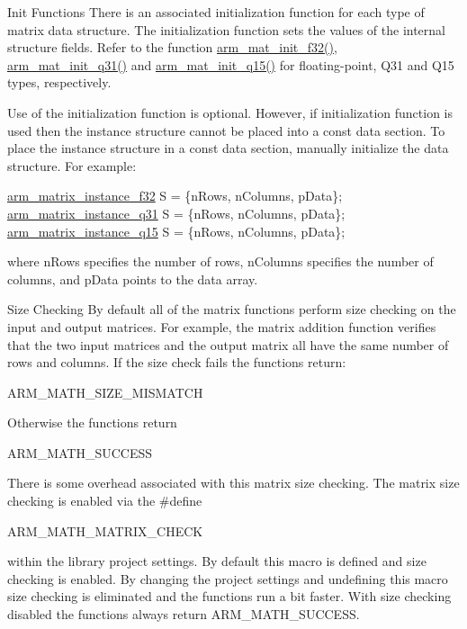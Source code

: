 \begin{DoxyParagraph}{Init Functions}
There is an associated initialization function for each type of matrix data structure. The initialization function sets the values of the internal structure fields. Refer to the function {\ttfamily \mbox{\hyperlink{arm__math_8h_a11e3dc41592a6401c13182fef9416a27}{arm\+\_\+mat\+\_\+init\+\_\+f32()}}}, {\ttfamily \mbox{\hyperlink{arm__math_8h_a48a5e5d37e1f062cc57fcfaf683343cc}{arm\+\_\+mat\+\_\+init\+\_\+q31()}}} and {\ttfamily \mbox{\hyperlink{arm__math_8h_a31a7c2b991803d49719393eb2d53dc26}{arm\+\_\+mat\+\_\+init\+\_\+q15()}}} for floating-\/point, Q31 and Q15 types, respectively.
\end{DoxyParagraph}
\begin{DoxyParagraph}{}
Use of the initialization function is optional. However, if initialization function is used then the instance structure cannot be placed into a const data section. To place the instance structure in a const data section, manually initialize the data structure. For example\+: 
\begin{DoxyPre}
{\ttfamily \mbox{\hyperlink{structarm__matrix__instance__f32}{arm\_matrix\_instance\_f32}} S = \{nRows, nColumns, pData\};}
{\ttfamily \mbox{\hyperlink{structarm__matrix__instance__q31}{arm\_matrix\_instance\_q31}} S = \{nRows, nColumns, pData\};}
{\ttfamily \mbox{\hyperlink{structarm__matrix__instance__q15}{arm\_matrix\_instance\_q15}} S = \{nRows, nColumns, pData\};}
\end{DoxyPre}
 where {\ttfamily n\+Rows} specifies the number of rows, {\ttfamily n\+Columns} specifies the number of columns, and {\ttfamily p\+Data} points to the data array.
\end{DoxyParagraph}
\begin{DoxyParagraph}{Size Checking}
By default all of the matrix functions perform size checking on the input and output matrices. For example, the matrix addition function verifies that the two input matrices and the output matrix all have the same number of rows and columns. If the size check fails the functions return\+: 
\begin{DoxyPre}
    ARM\_MATH\_SIZE\_MISMATCH
\end{DoxyPre}
 Otherwise the functions return 
\begin{DoxyPre}
    ARM\_MATH\_SUCCESS
\end{DoxyPre}
 There is some overhead associated with this matrix size checking. The matrix size checking is enabled via the \#define 
\begin{DoxyPre}
    ARM\_MATH\_MATRIX\_CHECK
\end{DoxyPre}
 within the library project settings. By default this macro is defined and size checking is enabled. By changing the project settings and undefining this macro size checking is eliminated and the functions run a bit faster. With size checking disabled the functions always return {\ttfamily A\+R\+M\+\_\+\+M\+A\+T\+H\+\_\+\+S\+U\+C\+C\+E\+SS}. 
\end{DoxyParagraph}
